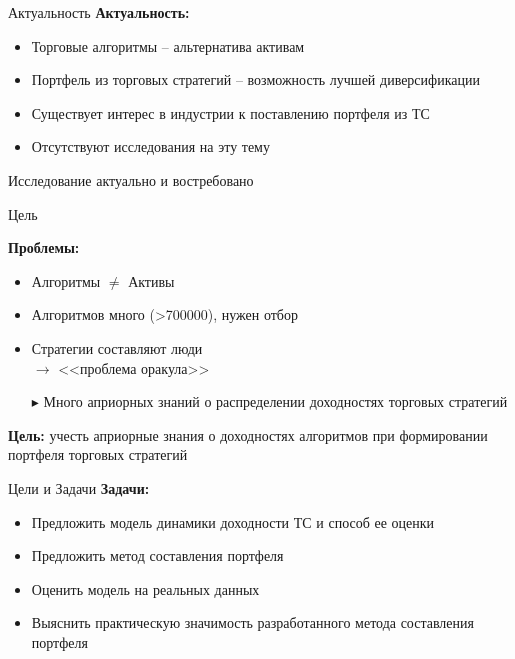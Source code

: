 \documentclass[12pt]{beamer}
\author[Кочуров М.В.]{%
	\begin{center}
		\large{Кочуров Максим}
	\end{center}
\vspace{2\baselineskip}
	\begin{flushright}
		Научный руководитель:\\
		доцент, к.э.н. Лукаш Е.Н.
	\end{flushright}%
}
\title[Моделирование динамики]{\thesisTitle}
\institute[МГУ]{\vspace{-\baselineskip}\normalsize\thesisOrganizationShort}
\date{\thesisCity, \thesisYear}
\begin{document}
\maketitle
\begin{frame}{Актуальность}
\textbf{Актуальность:}
\begin{itemize}
	\item Торговые алгоритмы -- альтернатива активам
	\item Портфель из торговых стратегий -- возможность лучшей диверсификации
	\item Существует интерес в индустрии к поставлению портфеля из ТС
	\item Отсутствуют исследования на эту тему
\end{itemize}
Исследование актуально и востребовано
\end{frame}
\begin{frame}{Цель}

\textbf{Проблемы:}
\begin{itemize}
	\item Алгоритмы $\ne$ Активы
	\item Алгоритмов много (>700000), нужен отбор
	\item Стратегии составляют люди \\$\rightarrow$ <<проблема оракула>>
	\item[$\blacktriangleright$] Много априорных знаний о распределении доходностях торговых стратегий
\end{itemize}
\vspace{\baselineskip}

\textbf{Цель:} учесть априорные знания о доходностях алгоритмов при формировании портфеля торговых стратегий
\end{frame}
\begin{frame}{Цели и Задачи}
\textbf{Задачи:}
\begin{itemize}
	\item Предложить модель динамики доходности ТС и способ ее оценки
	\item Предложить метод составления портфеля
	\item Оценить модель на реальных данных
	\item Выяснить практическую значимость разработанного метода составления портфеля
\end{itemize}
\end{frame}
\end{document}
